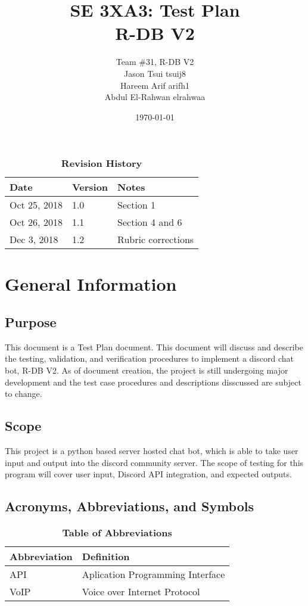 \documentclass[12pt, titlepage]{article}
\title{SE 3XA3: Test Plan\\R-DB V2}
\author{Team \#31, R-DB V2
		\\ Jason Tsui tsuij8
		\\ Hareem Arif arifh1
		\\ Abdul El-Rahwan elrahwaa
}
\date{\today}
\begin{document}
\maketitle

\tableofcontents
\listoftables
\listoffigures

\begin{table}[bp]
\caption{\bf Revision History}
\begin{tabularx}{\textwidth}{p{3cm}p{2cm}X}
\toprule {\bf Date} & {\bf Version} & {\bf Notes}\\
\midrule
Oct 25, 2018 & 1.0 & Section 1\\
Oct 26, 2018 & 1.1 & Section 4 and 6\\
Dec 3, 2018 & 1.2 & Rubric corrections\\
\bottomrule
\end{tabularx}
\end{table}

\newpage


\section{General Information}

\subsection{Purpose}
This document is a Test Plan document. This document will discuss and describe the testing, validation, and verification procedures to implement a discord chat bot, R-DB V2. As of document creation, the project is still undergoing major development and the test case procedures and descriptions disscussed are subject to change.

\subsection{Scope}
This project is a python based server hosted chat bot, which is able to take user input and output into the discord community server. The scope of testing for this program will cover user input, Discord API integration, and expected outputs. 

\subsection{Acronyms, Abbreviations, and Symbols}
	
\begin{table}[hbp]
\caption{\textbf{Table of Abbreviations}} \label{Table}

\begin{tabularx}{\textwidth}{p{3cm}X}
\toprule
\textbf{Abbreviation} & \textbf{Definition} \\
\midrule
API & Aplication Programming Interface\\
VoIP & Voice over Internet Protocol\\
\bottomrule
\end{tabularx}

\end{table}
\end{document}

